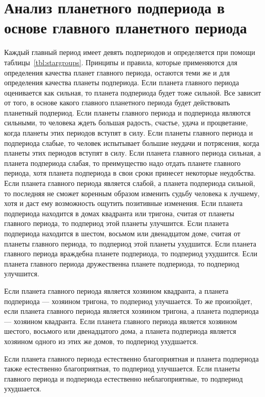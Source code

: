 \section[Анализ планетного подпериода]{Анализ планетного подпериода в основе главного планетного периода}

Каждый главный период имеет девять подпериодов и определяется при помощи таблицы~\ref{tbl:stargroups}. Принципы и правила, которые применяются для определения качества планет главного периода, остаются теми же и для определения качества планеты подпериода. Если планета главного периода оценивается как сильная, то планета подпериода будет тоже сильной. Все зависит от того, в основе какого главного планетного периода будет действовать планетный подпериод. Если планеты главного периода и подпериода являются сильными, то человека ждеть большая радость, счастье, удача и процветание, когда планеты этих периодов вступят в силу. Если планеты главного периода и подпериода слабые, то человек испытывает большие неудачи и потрясения, когда планеты этих периодов вступят в силу. Если планета главного периода сильная, а планета подпериода слабая, то преимущество надо отдать планете главного периода, хотя планета подпериода в свои сроки принесет некоторые неудобства. Если планета главного периода является слабой, а планета подпериода сильной, то последняя не сможет коренным образом изменить судьбу человека к лучшему, хотя и даст ему возможность ощутить позитивные изменения. Если планета подпериода находится в домах квадранта или тригона, считая от планеты главного периода, то подпериод этой планеты улучшится. Если планета подпериода находится в шестом, восьмом или двенадцатом доме, считая от планеты главного периода, то подпериод этой планеты ухудшится. Если планета главного периода враждебна планете подпериода, то подпериод ухудшится. Если планета главного периода дружественна планете подпериода, то подпериод улучшится.

Если планета главного периода является хозяином квадранта, а планета подпериода --- хозяином тригона, то подпериод улучшается. То же произойдет, если планета главного периода является хозяином тригона, а планета подпериода --- хозяином квадранта. Если планета главного периода является хозяином шестого, восьмого или двенадцатого дома, а планета подпериода является хозяином одного из этих же домов, то подпериод ухудшается.

Если планета главного периода естественно благоприятная и планета подпериода также естественно благоприятная, то подпериод улучшается. Если планеты главного периода и подпериода естественно неблагоприятные, то подпериод ухудшается.

